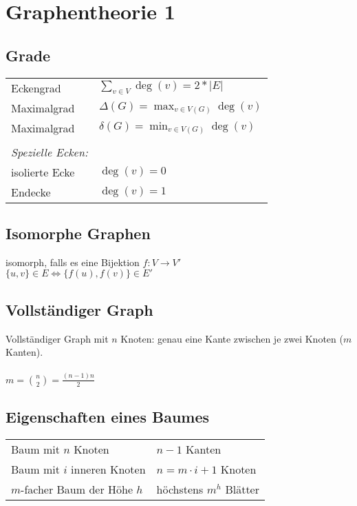\section{Graphentheorie 1}

\subsection{Grade}
\begin{tabular}{@{}ll}
    Eckengrad & $ \sum_{v \in V} \deg(v) = 2 * |E| $ \\
    Maximalgrad & $ \Delta(G) = \max_{v \in V(G)} {\deg}(v) $ \\
    Maximalgrad & $ \delta(G) = \min_{v \in V(G)} {\deg}(v) $ \\
    & \\
    \textit{Spezielle Ecken:} & \\
    isolierte Ecke & $ \deg(v) = 0 $ \\
    Endecke & $ \deg(v) = 1 $ \\
\end{tabular}

\subsection{Isomorphe Graphen}
isomorph, falls es eine Bijektion $ f : V \rightarrow V'$ \\
$ \{ u, v \} \in E \Leftrightarrow \{f(u), f(v)\} \in E' $

\subsection{Vollständiger Graph}
Vollständiger Graph mit $n$ Knoten: genau eine Kante zwischen je zwei Knoten ($m$ Kanten). \\
\\
$ m = \binom{n}{2} = \frac{(n-1)n}{2} $ 

\subsection{Eigenschaften eines Baumes}
\begin{tabular}{@{}ll}
    Baum mit $n$ Knoten & $n-1$ Kanten \\
    Baum mit $i$ inneren Knoten & $n=m \cdot i + 1$ Knoten \\
    $m$-facher Baum der Höhe $h$ & höchstens $m^h$ Blätter \\
\end{tabular}

